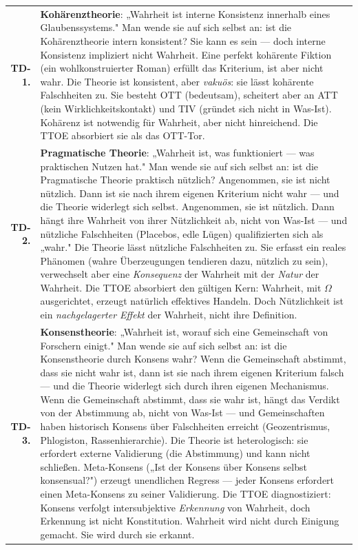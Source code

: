 \documentclass[10pt, openany, oneside]{book}
\renewcommand{\footnotesize}{\fontsize{8.5}{11}\selectfont}
\begin{document}
{\footnotesize
\noindent\begin{tabular}{r p{}}
\textbf{TD-1.} & \textbf{Kohärenztheorie}: „Wahrheit ist interne Konsistenz innerhalb eines Glaubenssystems." Man wende sie auf sich selbst an: ist die Kohärenztheorie intern konsistent? Sie kann es sein --- doch interne Konsistenz impliziert nicht Wahrheit. Eine perfekt kohärente Fiktion (ein wohlkonstruierter Roman) erfüllt das Kriterium, ist aber nicht wahr. Die Theorie ist konsistent, aber \textit{vakuös}: sie lässt kohärente Falschheiten zu. Sie besteht OTT (bedeutsam), scheitert aber an ATT (kein Wirklichkeitskontakt) und TIV (gründet sich nicht in Was-Ist). Kohärenz ist notwendig für Wahrheit, aber nicht hinreichend. Die TTOE absorbiert sie als das OTT-Tor. \\[0.5em]
\textbf{TD-2.} & \textbf{Pragmatische Theorie}: „Wahrheit ist, was funktioniert --- was praktischen Nutzen hat." Man wende sie auf sich selbst an: ist die Pragmatische Theorie praktisch nützlich? Angenommen, sie ist nicht nützlich. Dann ist sie nach ihrem eigenen Kriterium nicht wahr --- und die Theorie widerlegt sich selbst. Angenommen, sie ist nützlich. Dann hängt ihre Wahrheit von ihrer Nützlichkeit ab, nicht von Was-Ist --- und nützliche Falschheiten (Placebos, edle Lügen) qualifizierten sich als „wahr." Die Theorie lässt nützliche Falschheiten zu. Sie erfasst ein reales Phänomen (wahre Überzeugungen tendieren dazu, nützlich zu sein), verwechselt aber eine \textit{Konsequenz} der Wahrheit mit der \textit{Natur} der Wahrheit. Die TTOE absorbiert den gültigen Kern: Wahrheit, mit $\Omega$ ausgerichtet, erzeugt natürlich effektives Handeln. Doch Nützlichkeit ist ein \textit{nachgelagerter Effekt} der Wahrheit, nicht ihre Definition. \\[0.5em]
\textbf{TD-3.} & \textbf{Konsenstheorie}: „Wahrheit ist, worauf sich eine Gemeinschaft von Forschern einigt." Man wende sie auf sich selbst an: ist die Konsenstheorie durch Konsens wahr? Wenn die Gemeinschaft abstimmt, dass sie nicht wahr ist, dann ist sie nach ihrem eigenen Kriterium falsch --- und die Theorie widerlegt sich durch ihren eigenen Mechanismus. Wenn die Gemeinschaft abstimmt, dass sie wahr ist, hängt das Verdikt von der Abstimmung ab, nicht von Was-Ist --- und Gemeinschaften haben historisch Konsens über Falschheiten erreicht (Geozentrismus, Phlogiston, Rassenhierarchie). Die Theorie ist heterologisch: sie erfordert externe Validierung (die Abstimmung) und kann nicht schließen. Meta-Konsens („Ist der Konsens über Konsens selbst konsensual?") erzeugt unendlichen Regress --- jeder Konsens erfordert einen Meta-Konsens zu seiner Validierung. Die TTOE diagnostiziert: Konsens verfolgt intersubjektive \textit{Erkennung} von Wahrheit, doch Erkennung ist nicht Konstitution. Wahrheit wird nicht durch Einigung gemacht. Sie wird durch sie erkannt. \\[0.3em]
\end{tabular}
}
\end{document}
